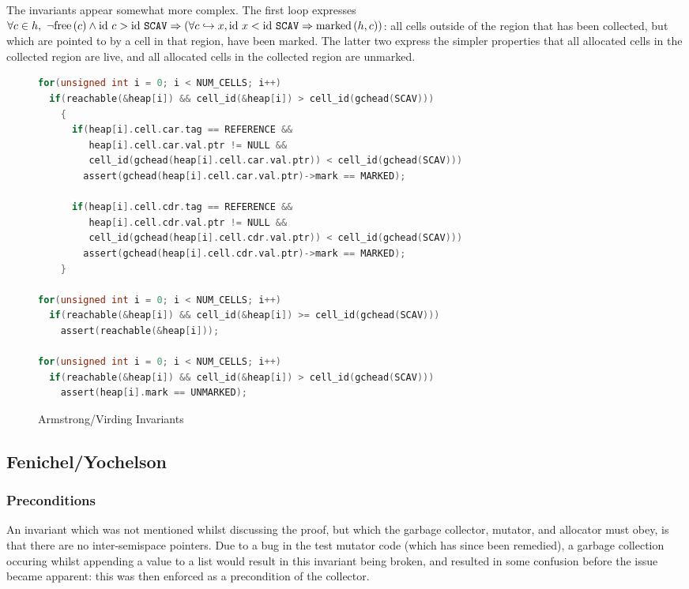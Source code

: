 The invariants appear somewhat more complex. The first loop expresses
$\forall c \in h,\ \lnot\mathrm{free}\left(c\right) \land \mathrm{id}~c > \mathrm{id}~\mathtt{SCAV} \Rightarrow
(\forall c \hookrightarrow x, \mathrm{id}~x < \mathrm{id}~\mathtt{SCAV} \Rightarrow
\mathrm{marked}\left(h, c\right))$: all cells outside of the region that has been
collected, but which are pointed to by a cell in that region, have
been marked. The latter two express the simpler properties that all
allocated cells in the collected region are live, and all allocated
cells in the collected region are unmarked.

\begin{figure}[H]
  \begin{lstlisting}[language=C]
for(unsigned int i = 0; i < NUM_CELLS; i++)
  if(reachable(&heap[i]) && cell_id(&heap[i]) > cell_id(gchead(SCAV)))
    {
      if(heap[i].cell.car.tag == REFERENCE &&
         heap[i].cell.car.val.ptr != NULL &&
         cell_id(gchead(heap[i].cell.car.val.ptr)) < cell_id(gchead(SCAV)))
        assert(gchead(heap[i].cell.car.val.ptr)->mark == MARKED);

      if(heap[i].cell.cdr.tag == REFERENCE &&
         heap[i].cell.cdr.val.ptr != NULL &&
         cell_id(gchead(heap[i].cell.cdr.val.ptr)) < cell_id(gchead(SCAV)))
        assert(gchead(heap[i].cell.cdr.val.ptr)->mark == MARKED);
    }

for(unsigned int i = 0; i < NUM_CELLS; i++)
  if(reachable(&heap[i]) && cell_id(&heap[i]) >= cell_id(gchead(SCAV)))
    assert(reachable(&heap[i]));

for(unsigned int i = 0; i < NUM_CELLS; i++)
  if(reachable(&heap[i]) && cell_id(&heap[i]) > cell_id(gchead(SCAV)))
    assert(heap[i].mark == UNMARKED);
  \end{lstlisting}
  \captionsetup{format=default}
  \caption{Armstrong/Virding Invariants}
\end{figure}

\subsection{Fenichel/Yochelson}
\label{sec:results-impl-c}

\subsubsection{Preconditions}
\label{sec:results-impl-c-pre}

An invariant which was not mentioned whilst discussing the proof, but
which the garbage collector, mutator, and allocator must obey, is that
there are no inter-semispace pointers. Due to a bug in the test
mutator code (which has since been remedied), a garbage collection
occuring whilst appending a value to a list would result in this
invariant being broken, and resulted in some confusion before the
issue became apparent: this was then enforced as a precondition of the
collector.

